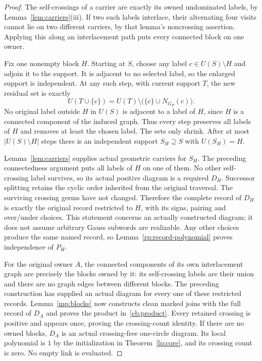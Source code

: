 \begin{proof}
The self-crossings of a carrier are exactly its owned undominated
labels, by Lemma~\ref{lem:carriers}(iii). If two such labels interlace,
their alternating four visits cannot lie on two different carriers,
by that lemma's noncrossing assertion. Applying this along an
interlacement path puts every connected block on one owner.

Fix one nonempty block $H$. Starting at $S$, choose any label
$c\in U(S)\setminus H$ and adjoin it to the support. It is adjacent
to no selected label, so the enlarged support is independent. At any
such step, with current support $T$, the new residual set is exactly
\begin{equation}\label{cb:greedy-step}
 U(T\cup\{c\})=U(T)\setminus\bigl(\{c\}\cup N_{G_P}(c)\bigr).
\end{equation}
No original label outside $H$ in $U(S)$ is adjacent to a label of $H$,
since $H$ is a connected component of the induced graph. Thus every
step preserves all labels of $H$ and removes at least the chosen label.
The sets only shrink. After at most $|U(S)\setminus H|$ steps there is
an independent support $S_H\supseteq S$ with $U(S_H)=H$.

Lemma~\ref{lem:carriers} supplies actual geometric carriers for $S_H$.
The preceding connectedness argument puts all labels of $H$ on one
of them. No other self-crossing label survives, so its actual positive
diagram is a required $D_H$. Successor splitting retains the cyclic
order inherited from the original traversal. The surviving crossing
germs have not changed. Therefore the complete record of $D_H$ is
exactly the original record restricted to $H$, with its signs, pairing
and over/under choices. This statement concerns an actually constructed
diagram; it does not assume arbitrary Gauss subwords are realizable.
Any other choices produce the same named record, so
Lemma~\ref{rp:record-polynomial} proves independence of $P_H$.

For the original owner $A$, the connected components of its own
interlacement graph are precisely the blocks owned by it: its
self-crossing labels are their union and there are no graph edges
between different blocks. The preceding construction has supplied an
actual diagram for every one of these restricted records.
Lemma~\ref{mp:blocks} now constructs clean marked joins with the full
record of $D_A$ and proves the product in~\eqref{cb:product}.
Every retained crossing is positive and appears once, proving the
crossing-count identity. If there are no owned blocks, $D_A$ is an
actual crossing-free one-circle diagram. Its local polynomial is $1$
by the initialization in Theorem~\ref{lp:core}, and its crossing count
is zero. No empty link is evaluated.
\end{proof}

